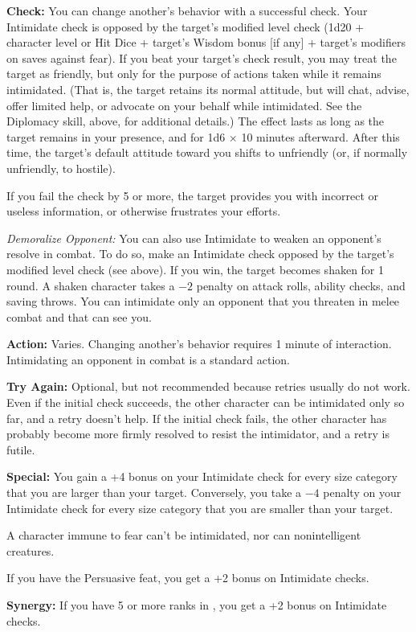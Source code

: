 \textbf{Check:} You can change another's behavior with a successful check. Your Intimidate check is opposed by the target's modified level check (1d20 + character level or Hit Dice + target's Wisdom bonus [if any] + target's modifiers on saves against fear). If you beat your target's check result, you may treat the target as friendly, but only for the purpose of actions taken while it remains intimidated. (That is, the target retains its normal attitude, but will chat, advise, offer limited help, or advocate on your behalf while intimidated. See the Diplomacy skill, above, for additional details.) The effect lasts as long as the target remains in your presence, and for 1d6 $\times$ 10 minutes afterward. After this time, the target's default attitude toward you shifts to unfriendly (or, if normally unfriendly, to hostile).

If you fail the check by 5 or more, the target provides you with incorrect or useless information, or otherwise frustrates your efforts.

\textit{Demoralize Opponent:} You can also use Intimidate to weaken an opponent's resolve in combat. To do so, make an Intimidate check opposed by the target's modified level check (see above). If you win, the target becomes shaken for 1 round. A shaken character takes a $-2$ penalty on attack rolls, ability checks, and saving throws. You can intimidate only an opponent that you threaten in melee combat and that can see you.

\textbf{Action:} Varies. Changing another's behavior requires 1 minute of interaction. Intimidating an opponent in combat is a standard action.

\textbf{Try Again:} Optional, but not recommended because retries usually do not work. Even if the initial check succeeds, the other character can be intimidated only so far, and a retry doesn't help. If the initial check fails, the other character has probably become more firmly resolved to resist the intimidator, and a retry is futile.

\textbf{Special:} You gain a +4 bonus on your Intimidate check for every size category that you are larger than your target. Conversely, you take a $-4$ penalty on your Intimidate check for every size category that you are smaller than your target.

A character immune to fear can't be intimidated, nor can nonintelligent creatures.

If you have the Persuasive feat, you get a +2 bonus on Intimidate checks.

\textbf{Synergy:} If you have 5 or more ranks in , you get a +2 bonus on Intimidate checks.